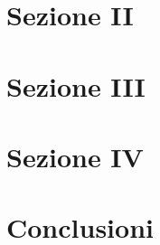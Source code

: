 \documentclass{beamer}
\begin{document}
\section{Sezione II}


\section{Sezione III}


\section{Sezione IV}


\section{Conclusioni}

\end{document}
